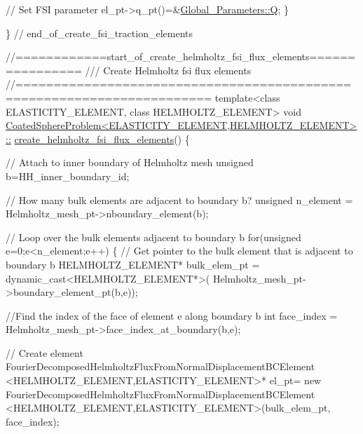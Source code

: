 \begin{DoxyCodeInclude}
{   \textcolor{comment}{// Set FSI parameter}
   el\_pt->q\_pt()=&\hyperlink{namespaceGlobal__Parameters_a7814fddf663e56168174a42d2cd6b4c1}{Global\_Parameters::Q};
  \}
 
\} \textcolor{comment}{// end\_of\_create\_fsi\_traction\_elements}



\textcolor{comment}{//============start\_of\_create\_helmholtz\_fsi\_flux\_elements================}\textcolor{comment}{}
\textcolor{comment}{/// Create Helmholtz fsi flux elements }
\textcolor{comment}{}\textcolor{comment}{//=======================================================================}
\textcolor{keyword}{template}<\textcolor{keyword}{class} ELASTICITY\_ELEMENT, \textcolor{keyword}{class} HELMHOLTZ\_ELEMENT>
\textcolor{keywordtype}{void} \hyperlink{classCoatedSphereProblem_a9a301689052eefd53552aadc23ff893b}{CoatedSphereProblem<ELASTICITY\_ELEMENT,HELMHOLTZ\_ELEMENT>::}
\hyperlink{classCoatedSphereProblem_a9a301689052eefd53552aadc23ff893b}{create\_helmholtz\_fsi\_flux\_elements}()
\{
 
 \textcolor{comment}{// Attach to inner boundary of Helmholtz mesh }
 \textcolor{keywordtype}{unsigned} b=HH\_inner\_boundary\_id;

 \textcolor{comment}{// How many bulk elements are adjacent to boundary b?}
 \textcolor{keywordtype}{unsigned} n\_element = Helmholtz\_mesh\_pt->nboundary\_element(b);
 
 \textcolor{comment}{// Loop over the bulk elements adjacent to boundary b}
 \textcolor{keywordflow}{for}(\textcolor{keywordtype}{unsigned} e=0;e<n\_element;e++)
  \{
   \textcolor{comment}{// Get pointer to the bulk element that is adjacent to boundary b}
   HELMHOLTZ\_ELEMENT* bulk\_elem\_pt = \textcolor{keyword}{dynamic\_cast<}HELMHOLTZ\_ELEMENT*\textcolor{keyword}{>}(
    Helmholtz\_mesh\_pt->boundary\_element\_pt(b,e));
   
   \textcolor{comment}{//Find the index of the face of element e along boundary b}
   \textcolor{keywordtype}{int} face\_index = Helmholtz\_mesh\_pt->face\_index\_at\_boundary(b,e);
   
   \textcolor{comment}{// Create element}
   FourierDecomposedHelmholtzFluxFromNormalDisplacementBCElement
    <HELMHOLTZ\_ELEMENT,ELASTICITY\_ELEMENT>* el\_pt=
    \textcolor{keyword}{new} FourierDecomposedHelmholtzFluxFromNormalDisplacementBCElement
    <HELMHOLTZ\_ELEMENT,ELASTICITY\_ELEMENT>(bulk\_elem\_pt,
                                           face\_index);
   
}
\end{DoxyCodeInclude}
